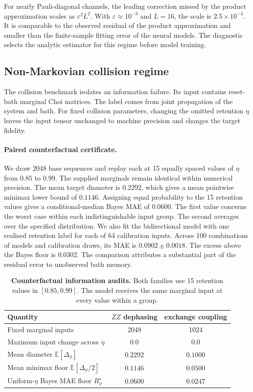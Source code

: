 \documentclass[12pt]{iopart}
\newcommand{\eps}{\varepsilon}
\begin{document}
For nearly Pauli-diagonal channels, the leading correction missed by the product approximation scales as $\eps^2L^2$. With $\eps\approx10^{-3}$ and $L=16$, the scale is $2.5\times10^{-4}$. It is comparable to the observed residual of the product approximation and smaller than the finite-sample fitting error of the neural models. The diagnostic selects the analytic estimator for this regime before model training.

\subsection{Non-Markovian collision regime}
\label{sec:exp_collision}

The collision benchmark isolates an information failure. Its input contains reset-bath marginal Choi matrices. The label comes from joint propagation of the system and bath. For fixed collision parameters, changing the omitted retention $\eta$ leaves the input tensor unchanged to machine precision and changes the target fidelity.

\paragraph*{Paired counterfactual certificate.}
We draw 2048 base sequences and replay each at 15 equally spaced values of $\eta$ from $0.85$ to $0.99$. The supplied marginals remain identical within numerical precision. The mean target diameter is $0.2292$, which gives a mean pointwise minimax lower bound of $0.1146$. Assigning equal probability to the 15 retention values gives a conditional-median Bayes MAE of $0.0600$. The first value concerns the worst case within each indistinguishable input group. The second averages over the specified distribution. We also fit the bidirectional model with one realised retention label for each of 64 calibration inputs. Across 100 combinations of models and calibration draws, its MAE is $0.0902\pm0.0018$. The excess above the Bayes floor is $0.0302$. The comparison attributes a substantial part of the residual error to unobserved bath memory.

\begin{table}[h]
\centering
\caption{\textbf{Counterfactual information audits.} Both families use 15 retention values in $[0.85,0.99]$. The model receives the same marginal input at every value within a group.}
\label{tab:ambiguity}
\small
\begin{tabular}{lcc}
\toprule
Quantity & $ZZ$ dephasing & exchange coupling \\
\midrule
Fixed marginal inputs & 2048 & 1024 \\
Maximum input change across $\eta$ & $0.0$ & $0.0$ \\
Mean diameter $\mathbb{E}[\Delta_\phi]$ & $0.2292$ & $0.1000$ \\
Mean minimax floor $\mathbb{E}[\Delta_\phi/2]$ & $0.1146$ & $0.0500$ \\
Uniform-$\eta$ Bayes MAE floor $R^\star_\phi$ & $0.0600$ & $0.0247$ \\
\bottomrule
\end{tabular}
\end{table}
\end{document}
